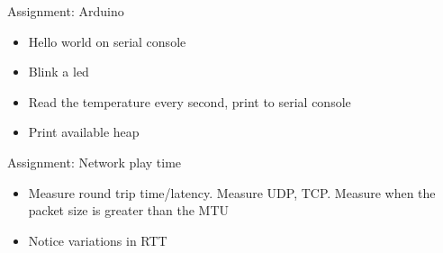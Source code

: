\begin{frame}{Assignment: Arduino}
\protect\hypertarget{assignment-arduino}{}

\begin{itemize}
\tightlist
\item
  Hello world on serial console
\item
  Blink a led
\item
  Read the temperature every second, print to serial console
\item
  Print available heap
\end{itemize}

\end{frame}

\begin{frame}{Assignment: Network play time}
\protect\hypertarget{assignment-network-play-time}{}

\begin{itemize}
\item
  Measure round trip time/latency. Measure UDP, TCP. Measure when the
  packet size is greater than the MTU
\item
  Notice variations in RTT
\end{itemize}

\end{frame}
